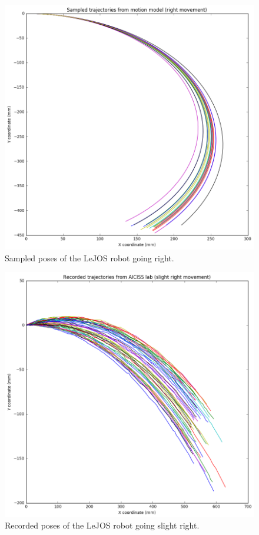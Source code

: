 \documentclass[paper=a4, fontsize=11pt]{scrartcl} %
\begin{document}
    \begin{figure}[h!]
        \begin{center}
            \setlength{\fboxsep}{0.5pt} %
            \setlength{\fboxrule}{0.5pt}
            \includegraphics[width=12cm,fbox]{images/sampled_poses_right.png}
            \caption{Sampled poses of the LeJOS robot going right.}
        \end{center}
    \end{figure}

    \begin{figure}[h!]
        \begin{center}
            \setlength{\fboxsep}{0.5pt} %
            \setlength{\fboxrule}{0.5pt}
            \includegraphics[width=12cm,fbox]{images/recorded_poses_slight_right.png}
            \caption{Recorded poses of the LeJOS robot going slight right.}
        \end{center}
    \end{figure}
\end{document}
